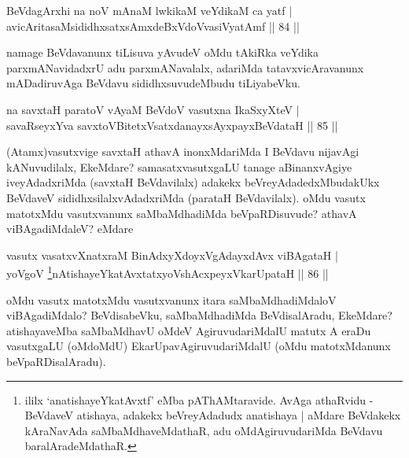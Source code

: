 
\begin{shl}
BeVdagArxhi na noV mAnaM lwkikaM veYdikaM ca yatf  | \\
avicAritasaMsididhxsatxsAmxdeBxVdoV\s vasiVyatAmf \hfill||  84 ||  
\end{shl}

\begin{artha}
namage BeVdavanunx tiLisuva yAvudeV oMdu tAkiRka veYdika parxmANavidadxrU adu parxmANavalalx, adariMda tatavxvicAravanunx mADadiruvAga BeVdavu sididhxsuvudeMbudu tiLiyabeVku.
\end{artha}

\begin{shl}
na savxtaH paratoV vA\s yaM BeVdoV vasutxna IkaSxyXteV  | \\
savaRseyxYva savxtoV\s BitetxVsatxdanayxsAyxpayxBeVdataH \hfill||  85 ||  
\end{shl}

\begin{artha}
(Atamx)vasutxvige savxtaH athavA inonxMdariMda I BeVdavu nijavAgi kANuvudilalx, EkeMdare? samasatxvasutxgaLU tanage aBinanxvAgiye iveyAdadxriMda (savxtaH BeVdavilalx) adakekx beVreyAdadedxMbudakUkx BeVdaveV sididhxsilalxvAdadxriMda (parataH BeVdavilalx). oMdu vasutx matotxMdu vasutxvanunx saMbaMdhadiMda beVpaRDisuvude? athavA viBAgadiMdaleV? eMdare 
\end{artha}


\begin{shl}
vasutx vasatxvXnatxraM BinAdxyXdoyxVgAdayxdAvx viBAgataH  | \\
yoVgoV \footnote{ililx `anatishayeYkatAvxtf' eMba pAThAMtaravide. AvAga athaRvidu - BeVdaveV atishaya, adakekx beVreyAdadudx anatishaya | aMdare BeVdakekx kAraNavAda saMbaMdhaveMdathaR, adu oMdAgiruvudariMda BeVdavu baralAradeMdathaR.}nAtishayeYkatAvxtatxyoVshAcxpeyxVkarUpataH \hfill||  86 ||  
\end{shl}

\begin{artha}
oMdu vasutx matotxMdu vasutxvanunx itara saMbaMdhadiMdaloV viBAgadiMdalo? BeVdisabeVku, saMbaMdhadiMda BeVdisalAradu, EkeMdare? atishayaveMba saMbaMdhavU oMdeV AgiruvudariMdalU matutx A eraDu vasutxgaLU (oMdoMdU) EkarUpavAgiruvudariMdalU (oMdu matotxMdanunx beVpaRDisalAradu).
\end{artha}


